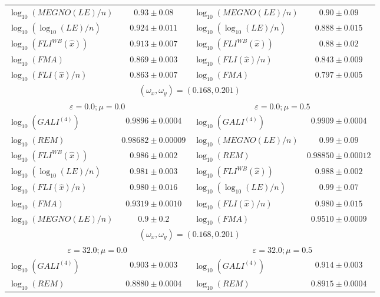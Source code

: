 \begin{table}[htb]
\begin{adjustbox}{width=\textwidth,center}
\begin{tabular}{lc|lc}
        $\log_{{10}}(MEGNO(LE)/n)$ & $0.93 \pm 0.08$ & $\log_{{10}}(MEGNO(LE)/n)$ & $0.90 \pm 0.09$ \\ 
        $\log_{{10}}(\log_{{10}}(LE)/n)$ & $0.924 \pm 0.011$ & $\log_{{10}}(\log_{{10}}(LE)/n)$ & $0.888 \pm 0.015$ \\ 
        $\log_{{10}}(FLI^{{WB}}(\hat{{x}}))$ & $0.913 \pm 0.007$ & $\log_{{10}}(FLI^{{WB}}(\hat{{x}}))$ & $0.88 \pm 0.02$ \\ 
        $\log_{{10}}(FMA)$ & $0.869 \pm 0.003$ & $\log_{{10}}(FLI(\hat{{x}})/n)$ & $0.843 \pm 0.009$ \\ 
        $\log_{{10}}(FLI(\hat{{x}})/n)$ & $0.863 \pm 0.007$ & $\log_{{10}}(FMA)$ & $0.797 \pm 0.005$ \\ 
        \hline
        \hline
        \multicolumn{4}{c}{$(\omega_x, \omega_y) = (0.168, 0.201)$} \\
         \multicolumn{2}{c|}{$\varepsilon = 0.0; \mu = 0.0$} & \multicolumn{2}{c}{$\varepsilon = 0.0; \mu = 0.5$} \\
        \hline
        $\log_{{10}}(GALI^{{(4)}})$ & $0.9896 \pm 0.0004$ & $\log_{{10}}(GALI^{{(4)}})$ & $0.9909 \pm 0.0004$ \\ 
        $\log_{{10}}(REM)$ & $0.98682 \pm 0.00009$ & $\log_{{10}}(MEGNO(LE)/n)$ & $0.99 \pm 0.09$ \\ 
        $\log_{{10}}(FLI^{{WB}}(\hat{{x}}))$ & $0.986 \pm 0.002$ & $\log_{{10}}(REM)$ & $0.98850 \pm 0.00012$ \\ 
        $\log_{{10}}(\log_{{10}}(LE)/n)$ & $0.981 \pm 0.003$ & $\log_{{10}}(FLI^{{WB}}(\hat{{x}}))$ & $0.988 \pm 0.002$ \\ 
        $\log_{{10}}(FLI(\hat{{x}})/n)$ & $0.980 \pm 0.016$ & $\log_{{10}}(\log_{{10}}(LE)/n)$ & $0.99 \pm 0.07$ \\ 
        $\log_{{10}}(FMA)$ & $0.9319 \pm 0.0010$ & $\log_{{10}}(FLI(\hat{{x}})/n)$ & $0.980 \pm 0.015$ \\ 
        $\log_{{10}}(MEGNO(LE)/n)$ & $0.9 \pm 0.2$ & $\log_{{10}}(FMA)$ & $0.9510 \pm 0.0009$ \\ 
        \hline
        \multicolumn{4}{c}{$(\omega_x, \omega_y) = (0.168, 0.201)$} \\
         \multicolumn{2}{c|}{$\varepsilon = 32.0; \mu = 0.0$} & \multicolumn{2}{c}{$\varepsilon = 32.0; \mu = 0.5$} \\
        \hline
        $\log_{{10}}(GALI^{{(4)}})$ & $0.903 \pm 0.003$ & $\log_{{10}}(GALI^{{(4)}})$ & $0.914 \pm 0.003$ \\ 
        $\log_{{10}}(REM)$ & $0.8880 \pm 0.0004$ & $\log_{{10}}(REM)$ & $0.8915 \pm 0.0004$ \\ 

\end{tabular}
\end{adjustbox}
\end{table}
